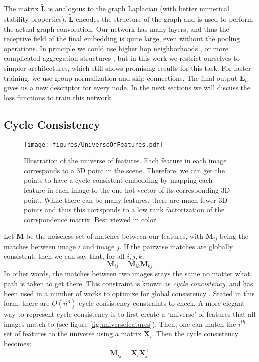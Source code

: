 \documentclass[10pt,twocolumn,letterpaper]{article}
\newcommand{\mat}[1]{\mathbf{#1}}
\begin{document}
The matrix $\widetilde{\mat{L}}$ is analogous to the graph Laplacian (with better numerical stability properties).
$\widetilde{\mat{L}}$ encodes the structure of the graph and is used to perform the actual graph convolution.
Our network has many layers, and thus the receptive field of the final embedding is quite large, even without the pooling operations.
In principle we could use higher hop neighborhoods \cite{gama2018convolutional}, or more complicated aggregation structures \cite{battaglia2018relational}, but in this work we restrict ourselves to simpler architectures, which still shows promising results for this task.
For faster training, we use group normalization \cite{wu2018group} and skip connections.
The final output $\mat{E}_n$ gives us a new descriptor for every node.
In the next sections we will discuss the loss functions to train this network.

\subsection{Cycle Consistency}

\begin{figure}[t]
\begin{center}
  \texttt{[image: figures/UniverseOfFeatures.pdf]}
\end{center}
  \caption{
    Illustration of the universe of features.
    Each feature in each image corresponds to a 3D point in the scene.
    Therefore, we can get the points to have a cycle consistent embedding by mapping each feature in each image to the one-hot vector of its corresponding 3D point.
    While there can be many features, there are much fewer 3D points and thus this corrsponds to a low rank factorization of the corrspondence matrix.
    Best viewed in color.
  }
\label{fig:universefeatures}
\label{fig:onecol}
\end{figure}

Let $\mat{M}$ be the noiseless set of matches between our features, with $\mat{M}_{ij}$ being the matches between image $i$ and image $j$.
If the pairwise matches are globally consistent, then we can say that, for all $i, j, k$:
\begin{equation}
\mat{M}_{ij} = \mat{M}_{ik} \mat{M}_{kj}
\label{eq:cycconsist1}
\end{equation}
In other words, the matches between two images stays the same no matter what path is taken to get there. 
This constraint is known as \textit{cycle concistency}, and has been used in a number of works to optimize for global consistency \cite{zhou2015multi, wang2017multi, leonardos2016distributed}.
Stated in this form, there are $O(n^3)$ cycle consistency constraints to check.
A more elegant way to represent cycle consistency is to first create a `universe' of features that all images match to (see figure \ref{fig:universefeatures}).
Then, one can match the $i^{th}$ set of features to the universe using a matrix $\mat{X}_i$.
Then the cycle consistency becomes:
\begin{equation}
\mat{M}_{ij} = \mat{X}_{i}\mat{X}_{j}^\top
\label{eq:cycconsist2}
\end{equation}
\end{document}

